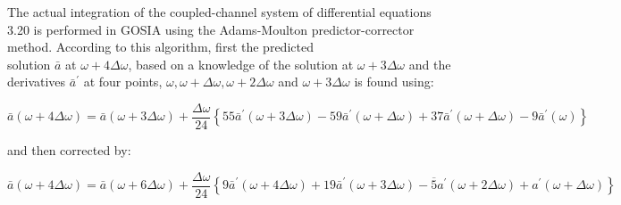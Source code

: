 \documentclass[10pt]{article}
\begin{document}
The actual integration of the coupled-channel system of differential equations 3.20 is performed in GOSIA using the Adams-Moulton predictor-corrector method. According to this algorithm, first the predicted\\
solution $\bar{a}$ at $\omega+4 \Delta \omega$, based on a knowledge of the solution at $\omega+3 \Delta \omega$ and the derivatives $\bar{a}^{\prime}$ at four points, $\omega, \omega+\Delta \omega, \omega+2 \Delta \omega$ and $\omega+3 \Delta \omega$ is found using:


\begin{equation*}
\bar{a}(\omega+4 \Delta \omega)=\bar{a}(\omega+3 \Delta \omega)+\frac{\Delta \omega}{24}\left\{55 \bar{a}^{\prime}(\omega+3 \Delta \omega)-59 \bar{a}^{\prime}(\omega+\Delta \omega)+37 \bar{a}^{\prime}(\omega+\Delta \omega)-9 \bar{a}^{\prime}(\omega)\right\} \tag{6.5}
\end{equation*}


and then corrected by:


\begin{equation*}
\bar{a}(\omega+4 \Delta \omega)=\bar{a}(\omega+6 \Delta \omega)+\frac{\Delta \omega}{24}\left\{9 \bar{a}^{\prime}(\omega+4 \Delta \omega)+19 \bar{a}^{\prime}(\omega+3 \Delta \omega)-\overline{5} a^{\prime}(\omega+2 \Delta \omega)+a^{\prime}(\omega+\Delta \omega)\right\} \tag{6.6}
\end{equation*}
\end{document}
